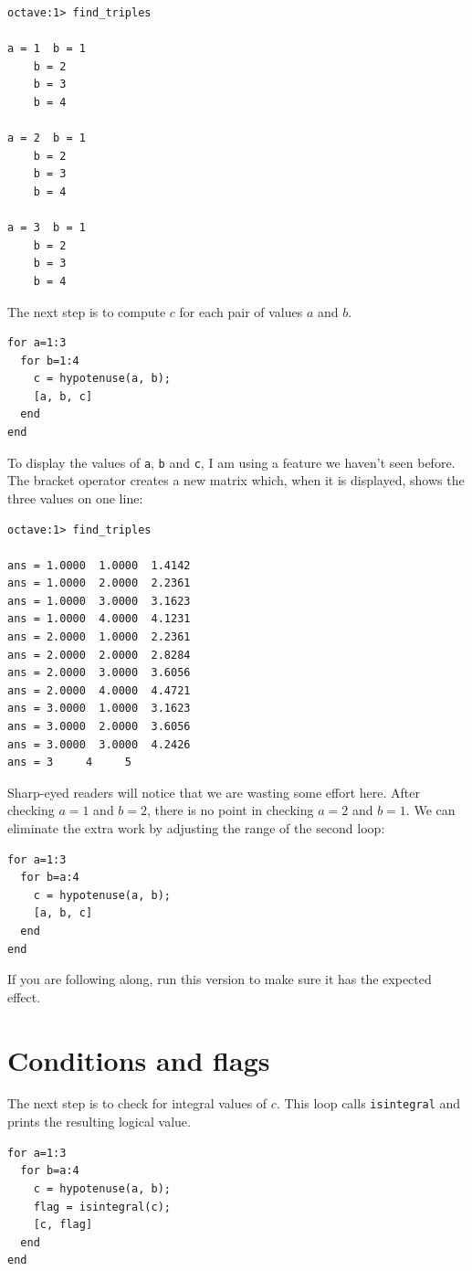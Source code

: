 \documentclass{book}
\begin{document}
\begin{verbatim}
octave:1> find_triples

a = 1  b = 1
    b = 2
    b = 3
    b = 4

a = 2  b = 1
    b = 2
    b = 3
    b = 4

a = 3  b = 1
    b = 2
    b = 3
    b = 4
\end{verbatim}

The next step is to compute $c$ for each pair of values $a$ and $b$.

\begin{verbatim}
for a=1:3
  for b=1:4
    c = hypotenuse(a, b);
    [a, b, c]
  end
end
\end{verbatim}

To display the values of {\tt a}, {\tt b} and {\tt c}, I am
using a feature we haven't seen before. The bracket operator
creates a new matrix which, when it is displayed, shows the
three values on one line:

\begin{verbatim}
octave:1> find_triples

ans = 1.0000  1.0000  1.4142
ans = 1.0000  2.0000  2.2361
ans = 1.0000  3.0000  3.1623
ans = 1.0000  4.0000  4.1231
ans = 2.0000  1.0000  2.2361
ans = 2.0000  2.0000  2.8284
ans = 2.0000  3.0000  3.6056
ans = 2.0000  4.0000  4.4721
ans = 3.0000  1.0000  3.1623
ans = 3.0000  2.0000  3.6056
ans = 3.0000  3.0000  4.2426
ans = 3     4     5
\end{verbatim}

Sharp-eyed readers will notice that we are wasting some effort here.
After checking $a=1$ and $b=2$, there is no point in checking
$a=2$ and $b=1$. We can eliminate the extra work by adjusting the
range of the second loop:

\begin{verbatim}
for a=1:3
  for b=a:4
    c = hypotenuse(a, b);
    [a, b, c]
  end
end
\end{verbatim}

If you are following along, run this version to make sure it has
the expected effect.


\section{Conditions and flags}

The next step is to check for integral values of $c$. This
loop calls {\tt isintegral} and prints the resulting logical
value.

\begin{verbatim}
for a=1:3
  for b=a:4
    c = hypotenuse(a, b);
    flag = isintegral(c);
    [c, flag]
  end
end
\end{verbatim}
\end{document}
